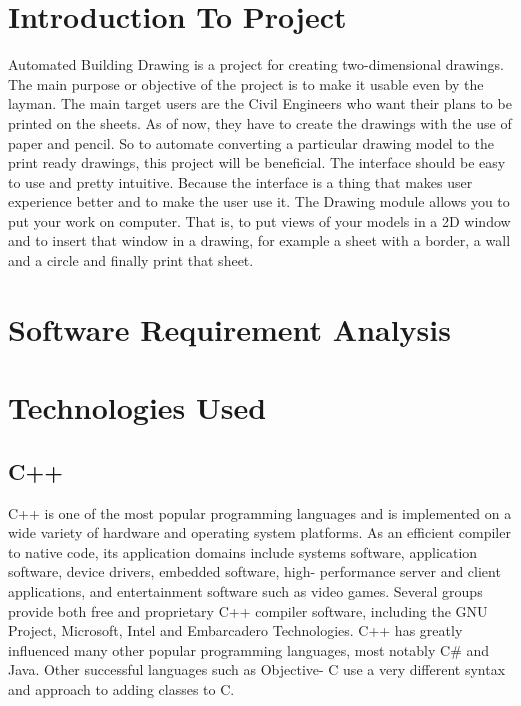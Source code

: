 \section{Introduction To Project} 
\noindent Automated Building Drawing is a project for creating two-dimensional drawings. The main purpose or objective of the project is to make it usable even by the layman. The main target users are the Civil Engineers who want their plans to be printed on the sheets. As of now, they have to create the drawings with the use of paper and pencil. So to automate converting a particular drawing model to the print ready drawings, this project will be beneficial. The interface should be easy
to use and pretty intuitive. Because the interface is a thing that makes user experience better and to make the user use it.
The Drawing module allows you to put your work on computer. That is, to put views of your
models in a 2D window and to insert that window in a drawing, for example a sheet with a border, a wall and a circle and finally print that sheet. 
\section{Software Requirement Analysis}

\section{Technologies Used}
\subsection{C++}
\noindent C++ is one of the most popular programming languages and is implemented on a wide variety of hardware and operating system platforms. As an efficient compiler to native code, its application domains include systems software, application software, device drivers, embedded software, high- performance server and client applications, and entertainment software such as video games. Several groups provide both free and proprietary C++ compiler software, including the GNU Project, Microsoft, Intel and Embarcadero Technologies. C++ has greatly influenced many other
popular programming languages, most notably C\# and Java. Other successful languages such as Objective- C use a very different syntax and approach to adding classes to C.\\

